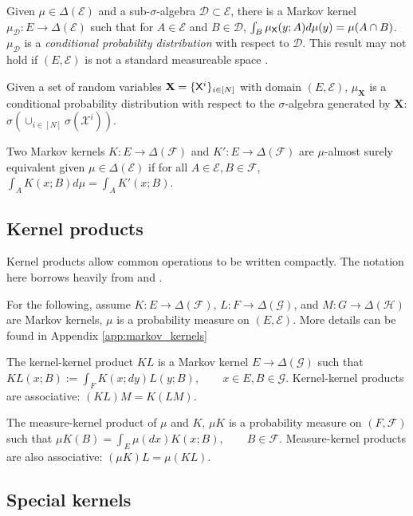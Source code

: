 Given $\mu\in \Delta(\mathcal{E})$ and a sub-$\sigma$-algebra $\mathcal{D}\subset\mathcal{E}$, there is a Markov kernel $\mu_{\mathcal{D}}:E\to\Delta(\mathcal{E})$ such that for $A\in\mathcal{E}$ and $B\in \mathcal{D}$, $\int_B \mu_{\mathsf{X}}(y;A) d\mu(y) = \mu(A\cap B)$. $\mu_{\mathcal{D}}$ is a \emph{conditional probability distribution} with respect to $\mathcal{D}$. This result may not hold if $(E,\mathcal{E})$ is not a standard measureable space \citep{cinlar_probability_2011}.

Given a set of random variables $\mathbf{X}=\{\mathsf{X}^i\}_{i\in [N]}$ with domain $(E,\mathcal{E})$, $\mu_{\mathbf{X}}$ is a conditional probability distribution with respect to the $\sigma$-algebra generated by $\mathbf{X}$: $\sigma(\cup_{i\in[N]}\sigma(\mathcal{X}^i))$. 

Two Markov kernels $K:E\to \Delta(\mathcal{F})$ and $K':E\to \Delta(\mathcal{F})$ are $\mu$-almost surely equivalent given $\mu\in \Delta(\mathcal{E})$ if for all $A\in \mathcal{E}, B\in\mathcal{F}$, $\int_A K(x;B) d\mu = \int_A K'(x;B)$.


\subsection{Kernel products}

Kernel products allow common operations to be written compactly. The notation here borrows heavily from \cite{cinlar_probability_2011} and \cite{fong_causal_2013}.

For the following, assume $K:E\to \Delta(\mathcal{F})$, $L:F\to \Delta(\mathcal{G})$, and $M:G\to \Delta(\mathcal{H})$ are Markov kernels, $\mu$ is a probability measure on $(E,\mathcal{E})$. More details can be found in Appendix \ref{app:markov_kernels}

The kernel-kernel product $KL$ is a Markov kernel $E\to \Delta(\mathcal{G})$ such that $KL(x;B):= \int_F K(x;dy) L(y;B),\qquad x\in E, B\in \mathcal{G}$. Kernel-kernel products are associative: $(KL)M=K(LM)$.

The measure-kernel product of $\mu$ and $K$, $\mu K$ is a probability measure on $(F,\mathcal{F})$ such that $\mu K(B)=\int_E \mu(dx) K(x;B),\qquad B\in\mathcal{F}$. Measure-kernel products are also associative: $(\mu K)L = \mu (KL)$.

\subsection{Special kernels}

